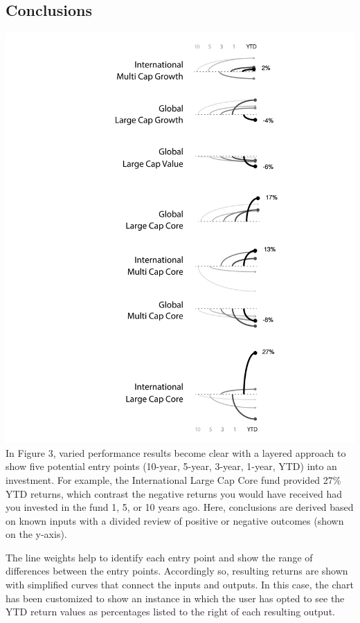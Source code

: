 \documentclass[]{book}
\theoremstyle{definition}
\theoremstyle{definition}
\theoremstyle{definition}
\theoremstyle{remark}
\begin{document}
\subsection{Conclusions}\label{conclusions}

\includegraphics{images/pattern-3.png} In Figure 3, varied performance
results become clear with a layered approach to show five potential
entry points (10-year, 5-year, 3-year, 1-year, YTD) into an investment.
For example, the International Large Cap Core fund provided 27\% YTD
returns, which contrast the negative returns you would have received had
you invested in the fund 1, 5, or 10 years ago. Here, conclusions are
derived based on known inputs with a divided review of positive or
negative outcomes (shown on the y-axis).

The line weights help to identify each entry point and show the range of
differences between the entry points. Accordingly so, resulting returns
are shown with simplified curves that connect the inputs and outputs. In
this case, the chart has been customized to show an instance in which
the user has opted to see the YTD return values as percentages listed to
the right of each resulting output.\citep{data_meaning}
\end{document}
